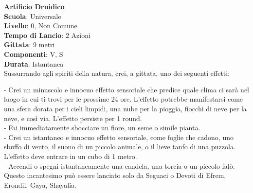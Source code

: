 \begin{multicols}{2}
\medskip\textbf{Artificio Druidico}\\
\textbf{Scuola}: Universale\\
\textbf{Livello}: 0, Non Comune\\
\textbf{Tempo di Lancio}: 2 Azioni\\
\textbf{Gittata}: 9 metri\\
\textbf{Componenti}: V, S\\
\textbf{Durata}: Istantanea\\
Sussurrando agli spiriti della natura, crei, a gittata, uno dei seguenti effetti:

- Crei un minuscolo e innocuo effetto sensoriale che predice quale clima ci sarà nel luogo in cui ti trovi per le prossime 24 ore. L'effetto potrebbe manifestarsi come una sfera dorata per i cieli limpidi, una nube per la pioggia, fiocchi di neve per la neve, e così via. L'effetto persiste per 1 round.\\

- Fai immediatamente sbocciare un fiore, un seme o simile pianta.\\

- Crei un istantaneo e innocuo effetto sensoriale, come foglie che cadono, uno sbuffo di vento, il suono di un piccolo animale, o il lieve tanfo di una puzzola. L'effetto deve entrare in un cubo di 1 metro.\\

- Accendi o spegni istantaneamente una candela, una torcia o un piccolo falò.\\

Questo incantesimo può essere lanciato solo da Seguaci o Devoti di Efrem, Erondil, Gaya, Shayalia.


\end{multicols}

